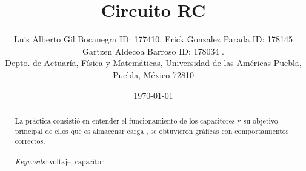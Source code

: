 \documentclass{article}
\begin{document}

\renewcommand{\footrulewidth}{1pt}
\renewcommand{\tablename}{Tabla}
\renewcommand{\figurename}{Figura}


\title{Circuito RC}
\author{\small{Luis Alberto Gil Bocanegra ID: 177410, Erick Gonzalez Parada ID: 178145}\\
 \small{Gartzen Aldecoa Barroso ID: 178034 .}\\		%
	   \small{Depto. de Actuaría, Física y Matemáticas, Universidad de las Américas Puebla, Puebla, M\'exico 72810}}
\date{\small{\today}}

\maketitle


\begin{abstract}
La práctica consistió en entender el funcionamiento de los capacitores y su objetivo principal de ellos que es almacenar carga
, se obtuvieron gráficas con comportamientos correctos.
\\
\\
{\it Keywords:}  voltaje, capacitor 
\\
\\
\end{abstract}
\end{document}
